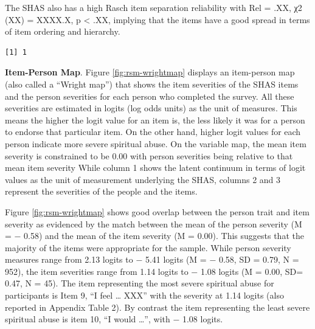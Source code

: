 \documentclass[
]{article}
\begin{document}
The SHAS also has a high Rasch item separation reliability with Rel = .XX, χ2 (XX) = XXXX.X, p \textless{} .XX, implying that the items have a good spread in terms of item ordering and hierarchy.

\begin{verbatim}
[1] 1
\end{verbatim}

\textbf{Item-Person Map}. Figure \ref{fig:rsm-wrightmap} displays an item-person map (also called a ``Wright map'') that shows the item severities of the SHAS items and the person severities for each person who completed the survey. All these severities are estimated in logits (log odds units) as the unit of measures. This means the higher the logit value for an item is, the less likely it was for a person to endorse that particular item. On the other hand, higher logit values for each person indicate more severe spiritual abuse. On the variable map, the mean item severity is constrained to be 0.00 with person severities being relative to that mean item severity While column 1 shows the latent continuum in terms of logit values as the unit of measurement underlying the SHAS, columns 2 and 3 represent the severities of the people and the items.

Figure \ref{fig:rsm-wrightmap} shows good overlap between the person trait and item severity as evidenced by the match between the mean of the person severity (M = − 0.58) and the mean of the item severity (M = 0.00). This suggests that the majority of the items were appropriate for the sample. While person severity measures range from 2.13 logits to − 5.41 logits (M = − 0.58, SD = 0.79, N = 952), the item severities range from 1.14 logits to − 1.08 logits (M = 0.00, SD= 0.47, N = 45). The item representing the most severe spiritual abuse for participants is Item 9, ``I feel \ldots{} XXX'' with the severity at 1.14 logits (also reported in Appendix Table 2). By contrast the item representing the least severe spiritual abuse is item 10, ``I would \ldots{}'', with − 1.08 logits.
\end{document}
